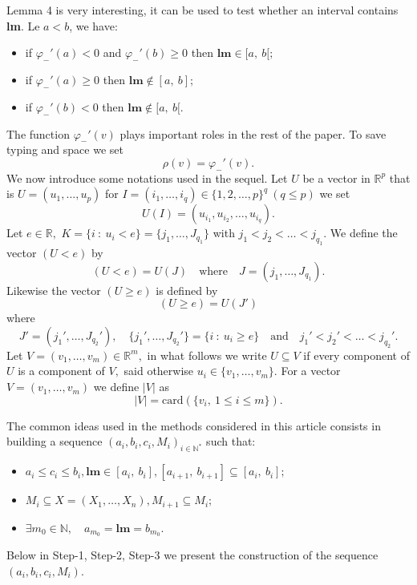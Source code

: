 \documentclass[
  11pt,
  a4paper,
]{article}
\newcommand\N{{\mathbb N}}
\newcommand\R{{\mathbb R}}
\begin{document}
Lemma 4 is very interesting, it can be used to test whether an interval contains \textbf{lm}. Le $a<b$, we have:
\begin{itemize}
	\item if  $\varphi_{-}'(a)<0$ and $\varphi_{-}'(b)\ge 0$ then $\mathbf{lm}\in [a,\ b[;$
	\item if  $\varphi_{-}'(a)\ge 0$ then $\mathbf{lm}\notin [a,\ b];$
	\item if  $\varphi_{-}'(b)< 0$ then $\mathbf{lm}\notin [a,\ b[.$
\end{itemize} 
The function $\varphi_{-}'(v)$ plays important roles in the rest of the paper. To save typing and space we set
\[
\rho(v)=\varphi_{-}'(v).
\]
We now introduce some notations used in the sequel. Let $U$ be a vector in $\R^p$ that is $U=(u_1,\ldots,u_p)$ for
$I=(i_1,\ldots,i_q)\in \{1,2,\ldots,p\}^q \ (q\leq p)$ we set
\[
U(I)=(u_{i_1},u_{i_2},\ldots,u_{i_q}).
\]
Let $e\in\R,$ $K=\{i\ : \ u_i<e\}=\{j_1,\ldots,J_{q_1}\}$ with $j_1<j_2<\ldots<j_{q_1}.$ We define the vector
$(U<e)$ by
\[
(U<e)=U(J)\quad \text{where}\quad J=(j_1,\ldots,J_{q_1}).
\]
Likewise the vector $(U\ge e)$ is defined by 
\[
(U\ge e)=U(J')
\] 
where
\[
J'=(j_1',\ldots,J_{q_2}'),\quad \{j_1',\ldots,J_{q_2}'\}=\{i\ : \ u_i\ge e\}\quad \text{and}\quad j_1'<j_2'<\ldots<j_{q_2}'.
\]        
Let $V=(v_1,\ldots,v_m)\in \R^m,$ in what follows we write $U\subseteq V$ if every component of $U$ is a component
of $V,$ said otherwise $u_i\in \{v_1,\ldots,v_m\}.$
For a vector $V=(v_1,\ldots,v_m)$ we define $\lvert V\rvert$ as
\[
\lvert V\rvert=\mathrm{card}(\{v_i,\ 1\leq i\leq m \}).
\]

The common ideas used in the methods considered in this article consists in building a sequence
$\left(a_i,b_i,c_i,M_i \right)_{i\in \N^*}$ such that:
\begin{itemize}
	\item[(i)] $a_i\leq c_i\leq b_i,$\quad $\mathbf{lm}\in [a_i,\ b_i],$\quad  $[a_{i+1},\ b_{i+1}] \subseteq [a_i,\ b_i] ;$
	\item[(ii)] $M_i\subseteq X=(X_1,\ldots,X_n),$\quad $M_{i+1}\subseteq M_i;$
	\item[(iii)] $\exists m_0\in \N,\quad a_{m_0}=\mathbf{lm}=b_{m_0}.$
\end{itemize}
Below in Step-1, Step-2,  Step-3 we present the construction of the sequence $\left(a_i,b_i,c_i,M_i \right).$
\end{document}
